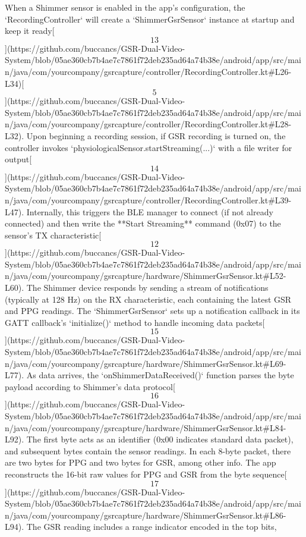 \documentclass[12pt,a4paper]{article}
\begin{document}
{When a Shimmer sensor is enabled in the app's configuration, the
`RecordingController` will create a `ShimmerGsrSensor` instance at
startup and keep it
ready[\[13\]](https://github.com/buccancs/GSR-Dual-Video-System/blob/05ae360cb7b4ae7c7861f72deb235ad64a74b38e/android/app/src/main/java/com/yourcompany/gsrcapture/controller/RecordingController.kt#L26-L34)[\[5\]](https://github.com/buccancs/GSR-Dual-Video-System/blob/05ae360cb7b4ae7c7861f72deb235ad64a74b38e/android/app/src/main/java/com/yourcompany/gsrcapture/controller/RecordingController.kt#L28-L32).
Upon beginning a recording session, if GSR recording is turned on, the
controller invokes `physiologicalSensor.startStreaming(...)` with a file
writer for
output[\[14\]](https://github.com/buccancs/GSR-Dual-Video-System/blob/05ae360cb7b4ae7c7861f72deb235ad64a74b38e/android/app/src/main/java/com/yourcompany/gsrcapture/controller/RecordingController.kt#L39-L47).
Internally, this triggers the BLE manager to connect (if not already
connected) and then write the **Start Streaming** command (0x07) to the
sensor's TX
characteristic[\[12\]](https://github.com/buccancs/GSR-Dual-Video-System/blob/05ae360cb7b4ae7c7861f72deb235ad64a74b38e/android/app/src/main/java/com/yourcompany/gsrcapture/hardware/ShimmerGsrSensor.kt#L52-L60).
The Shimmer device responds by sending a stream of notifications
(typically at 128 Hz) on the RX characteristic, each containing the
latest GSR and PPG readings. The `ShimmerGsrSensor` sets up a
notification callback in its GATT callback's `initialize()` method to
handle incoming data
packets[\[15\]](https://github.com/buccancs/GSR-Dual-Video-System/blob/05ae360cb7b4ae7c7861f72deb235ad64a74b38e/android/app/src/main/java/com/yourcompany/gsrcapture/hardware/ShimmerGsrSensor.kt#L69-L77).
As data arrives, the `onShimmerDataReceived()` function parses the byte
payload according to Shimmer's data
protocol[\[16\]](https://github.com/buccancs/GSR-Dual-Video-System/blob/05ae360cb7b4ae7c7861f72deb235ad64a74b38e/android/app/src/main/java/com/yourcompany/gsrcapture/hardware/ShimmerGsrSensor.kt#L84-L92).
The first byte acts as an identifier (0x00 indicates standard data
packet), and subsequent bytes contain the sensor readings. In each
8-byte packet, there are two bytes for PPG and two bytes for GSR, among
other info. The app reconstructs the 16-bit raw values for PPG and GSR
from the byte
sequence[\[17\]](https://github.com/buccancs/GSR-Dual-Video-System/blob/05ae360cb7b4ae7c7861f72deb235ad64a74b38e/android/app/src/main/java/com/yourcompany/gsrcapture/hardware/ShimmerGsrSensor.kt#L86-L94).
The GSR reading includes a range indicator encoded in the top bits,
}
\end{document}
